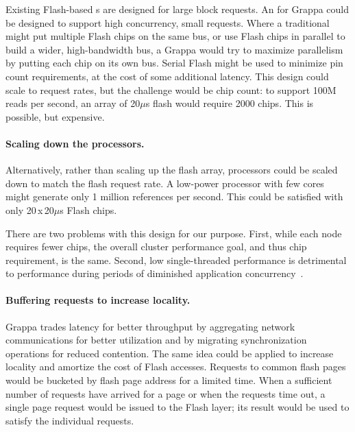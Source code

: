 Existing Flash-based \hspace{0.75pt}s are designed for large block requests. An
 for Grappa could be designed to support high concurrency, small
requests. Where a traditional  might put multiple Flash chips on
the same bus, or use Flash chips in parallel to build a wider,
high-bandwidth bus, a Grappa  would try to maximize parallelism by
putting each chip on its own bus. Serial Flash might be used to
minimize pin count requirements, at the cost of some additional
latency. This design could scale to request rates, but the challenge
would be chip count: to support 100M reads per second, an array of
20$\mu$s flash would require 2000 chips. This is possible, but expensive.

\paragraph{Scaling down the processors.}
Alternatively, rather than scaling up the flash array, processors
could be scaled down to match the flash request rate. A low-power
processor with few cores might generate only 1 million references per
second. This could be satisfied with only 20\,x\,20$\mu$s Flash chips.

There are two problems with this design for our purpose. First, while each node
requires fewer chips, the overall cluster performance goal, and thus
chip requirement, is the same. Second, low single-threaded performance is detrimental to performance during periods of diminished application concurrency~\cite{feo:xmt}.

\paragraph{Buffering requests to increase locality.}
Grappa trades latency for better throughput by aggregating network
communications for better utilization and by migrating synchronization
operations for reduced contention. The same idea could be applied to
increase locality and amortize the cost of Flash accesses. Requests
to common flash pages would be bucketed by flash page address for a
limited time. When a sufficient number of requests have arrived for a page
or when the requests time out, a single page request would be issued to the Flash
layer; its result would be used to satisfy the individual requests.

